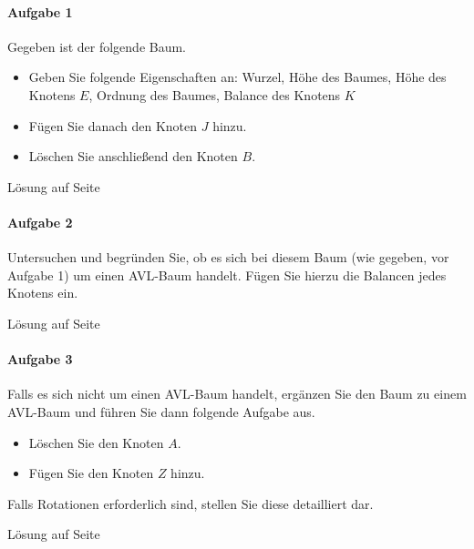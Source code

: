 \documentclass[11pt,a4paper]{scrartcl}
\begin{document}
\paragraph{Aufgabe 1} Gegeben ist der folgende Baum.
\begin{itemize}
\item Geben Sie folgende Eigenschaften an: Wurzel, Höhe des Baumes, Höhe des Knotens $E$, Ordnung des Baumes, Balance des Knotens $K$
\item Fügen Sie danach den Knoten $J$ hinzu.
\item Löschen Sie anschließend den Knoten $B$.
\end{itemize}
\begin{figure}[h]
\centering
{}
\end{figure}
\begin{flushright}
Lösung auf Seite \pageref{a4.1:lsg} \\
\end{flushright}
\paragraph{Aufgabe 2}
Untersuchen und begründen Sie, ob es sich bei diesem Baum (wie gegeben, vor Aufgabe 1) um einen AVL-Baum handelt. Fügen Sie hierzu die Balancen jedes Knotens ein. 
\begin{flushright}
Lösung auf Seite \pageref{a4.2:lsg}
\end{flushright}
\paragraph{Aufgabe 3}
Falls es sich nicht um einen AVL-Baum handelt, ergänzen Sie den Baum zu einem AVL-Baum und führen Sie dann folgende Aufgabe aus.
\begin{itemize}
\item Löschen Sie den Knoten $A$.
\item Fügen Sie den Knoten $Z$ hinzu. 
\end{itemize}
Falls Rotationen erforderlich sind, stellen Sie diese detailliert dar. 
\begin{flushright}
Lösung auf Seite \pageref{a4.3:lsg}
\end{flushright}
\end{document}
